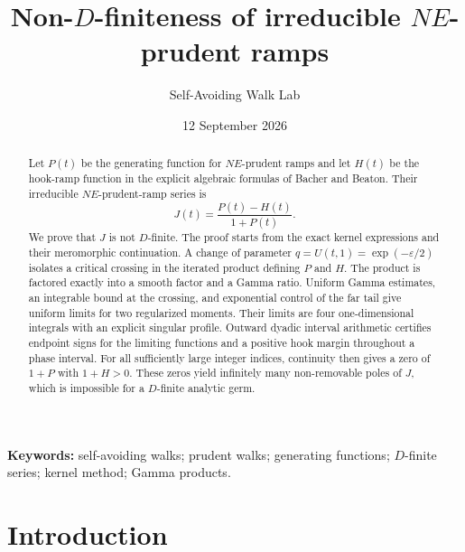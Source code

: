\documentclass[11pt]{article}
\title{Non-\texorpdfstring{$D$}{D}-finiteness of irreducible
\texorpdfstring{$NE$}{NE}-prudent ramps}
\author{Self-Avoiding Walk Lab}
\date{12 September 2026}
\theoremstyle{definition}
\theoremstyle{remark}
\begin{document}
\maketitle

\begin{center}
\end{center}

\begin{abstract}
Let \(P(t)\) be the generating function for \(NE\)-prudent ramps and let
\(H(t)\) be the hook-ramp function in the explicit algebraic formulas of
Bacher and Beaton.  Their irreducible \(NE\)-prudent-ramp series is
\[
  J(t)=\frac{P(t)-H(t)}{1+P(t)}.
\]
We prove that \(J\) is not \(D\)-finite.  The proof starts from the exact
kernel expressions and their meromorphic continuation.  A change of
parameter \(q=U(t,1)=\exp(-\varepsilon/2)\) isolates a critical crossing in
the iterated product defining \(P\) and \(H\).  The product is factored
exactly into a smooth factor and a Gamma ratio.  Uniform Gamma estimates,
an integrable bound at the crossing, and exponential control of the far tail
give uniform limits for two regularized moments.  Their limits are four
one-dimensional integrals with an explicit singular profile.  Outward
dyadic interval arithmetic certifies endpoint signs for the limiting
functions and a positive hook margin throughout a phase interval.  For all
sufficiently large integer indices, continuity then gives a zero of
\(1+P\) with \(1+H>0\).  These zeros yield infinitely many non-removable
poles of \(J\), which is impossible for a \(D\)-finite analytic germ.
\end{abstract}

\noindent\textbf{Keywords:} self-avoiding walks; prudent walks; generating
functions; \(D\)-finite series; kernel method; Gamma products.

\section{Introduction}
\end{document}
